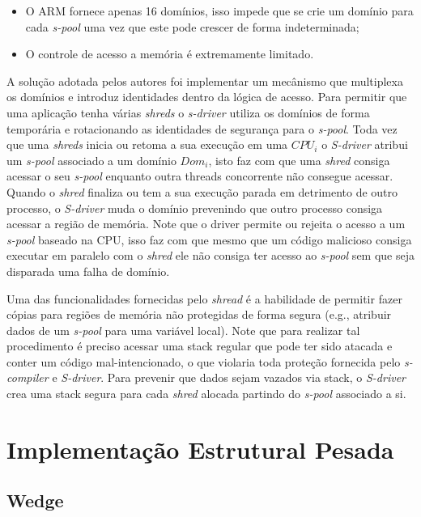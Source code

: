 \begin{itemize}
  \item O ARM fornece apenas 16 domínios, isso impede que se crie um domínio
        para cada \emph{s-pool} uma vez que este pode crescer de forma
        indeterminada;
  \item O controle de acesso a memória é extremamente limitado.
\end{itemize}

A solução adotada pelos autores foi implementar um mecânismo que multiplexa os
domínios e introduz identidades dentro da lógica de acesso. Para permitir que
uma aplicação tenha várias \emph{shreds} o \emph{s-driver} utiliza os domínios
de forma temporária e rotacionando as identidades de segurança para o
\emph{s-pool}. Toda vez que uma \emph{shreds} inicia ou retoma a sua execução
em uma $CPU_i$ o \emph{S-driver} atribui um \emph{s-pool} associado a um
domínio $Dom_i$, isto faz com que uma \emph{shred} consiga acessar o seu
\emph{s-pool} enquanto outra threads concorrente não consegue acessar. Quando o
\emph{shred} finaliza ou tem a sua execução parada em detrimento de outro
processo, o \emph{S-driver} muda o domínio prevenindo que outro processo
consiga acessar a região de memória. Note que o driver permite ou rejeita o
acesso a um \emph{s-pool} baseado na CPU, isso faz com que mesmo que um código
malicioso consiga executar em paralelo com o \emph{shred} ele não consiga ter
acesso ao \emph{s-pool} sem que seja disparada uma falha de domínio.

Uma das funcionalidades fornecidas pelo \emph{shread} é a habilidade de
permitir fazer cópias para regiões de memória não protegidas de forma segura
(e.g., atribuir dados de um \emph{s-pool} para uma variável local). Note que
para realizar tal procedimento é preciso acessar uma stack regular que pode ter
sido atacada e conter um código mal-intencionado, o que violaria toda proteção
fornecida pelo \emph{s-compiler} e \emph{S-driver}. Para prevenir que dados
sejam vazados via stack, o \emph{S-driver} crea uma stack segura para cada
\emph{shred} alocada partindo do \emph{s-pool} associado a si.

\section{Implementação Estrutural Pesada}

\subsection{Wedge}

